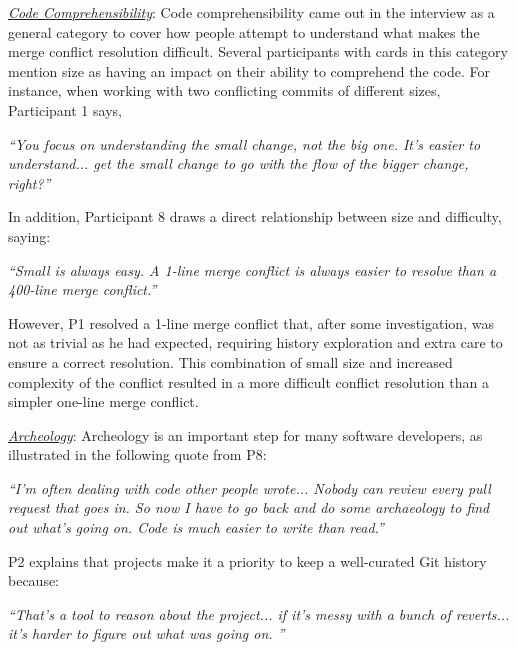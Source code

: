 
\underline{\textit{Code Comprehensibility}}:
Code comprehensibility came out in the interview as a general category to cover how people attempt to understand what makes the merge conflict resolution difficult. Several participants with cards in this category mention size as having an impact on their ability to comprehend the code. For instance, when working with two conflicting commits of different sizes, Participant 1 says,
\begin{displayquote}
\textit{``You focus on understanding the small change, not the big one. It's easier to understand... get the small change to go with the flow of the bigger change, right?''}
\end{displayquote}	

In addition, Participant 8 draws a direct relationship between size and difficulty, saying:
\begin{displayquote}
\textit{``Small is always easy. A 1-line merge conflict is always easier to resolve than a 400-line merge conflict.''}
\end{displayquote}

However, P1 resolved a 1-line merge conflict that, after some investigation, was not as trivial as he had expected, requiring history exploration and extra care to ensure a correct resolution. This combination of small size and increased complexity of the conflict resulted in a more difficult conflict resolution than a simpler one-line merge conflict.

\underline{\textit{Archeology}}:
Archeology is an important step for many software developers, as illustrated in the following quote from P8:
\begin{displayquote}
\textit{``I'm often dealing with code other people wrote... Nobody can review every pull request that goes in. So now I have to go back and do some archaeology to find out what's going on. Code is much easier to write than read.''}
\end{displayquote}
P2 explains that projects make it a priority to keep a well-curated Git history because:
\begin{displayquote}
\textit{``That's a tool to reason about the project... if it's messy with a bunch of reverts... it's harder to figure out what was going on.	''}
\end{displayquote}

